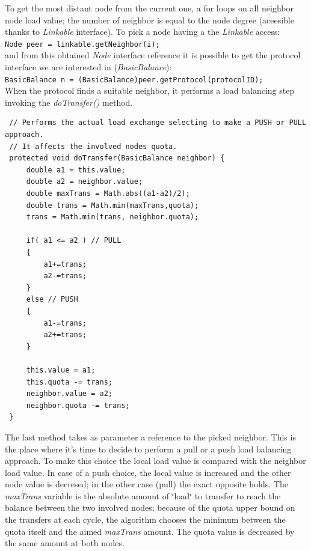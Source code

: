\documentclass[a4paper,12pt]{article}
\begin{document}
To get the most distant node from the current one, a for loops on
all neighbor node load value; the number of neighbor is equal to the
node degree (aceesible thanks to \emph{Linkable} interface). To pick
a node having a the \emph{Linkable} access:\\


\texttt{\footnotesize Node peer = linkable.getNeighbor(i);} \\


and from this obtained \emph{Node} interface reference it is possible
to get the protocol interface we are interested in (\emph{BasicBalance}):\\


\texttt{\footnotesize BasicBalance n = (BasicBalance)peer.getProtocol(protocolID);}
\\


When the protocol finds a suitable neighbor, it performs a load balancing
step invoking the \emph{doTransfer()} method.\\

\footnotesize
\begin{verbatim}
 // Performs the actual load exchange selecting to make a PUSH or PULL approach.
 // It affects the involved nodes quota. 
 protected void doTransfer(BasicBalance neighbor) {
     double a1 = this.value;
     double a2 = neighbor.value;
     double maxTrans = Math.abs((a1-a2)/2);
     double trans = Math.min(maxTrans,quota);
     trans = Math.min(trans, neighbor.quota);
 
     if( a1 <= a2 ) // PULL
     {
         a1+=trans;
         a2-=trans;
     }
     else // PUSH
     {
         a1-=trans;
         a2+=trans;
     }
     
     this.value = a1;
     this.quota -= trans;
     neighbor.value = a2;
     neighbor.quota -= trans; 
 }
\end{verbatim}
\normalsize


The last method takes as parameter a reference to the picked neighbor.
This is the place where it's time to decide to perform a pull or a
push load balancing approach. To make this choice the local load value
is compared with the neighbor load value. In case of a push choice,
the local value is increased and the other node value is decresed;
in the other case (pull) the exact opposite holds. The \emph{maxTrans}
variable is the absolute amount of \char`\"{}load\char`\"{} to transfer
to reach the balance between the two involved nodes; because of the
quota upper bound on the transfers at each cycle, the algorithm chooses
the minimum between the quota itself and the aimed \emph{maxTrans}
amount. The quota value is decreased by the same amount at both nodes.
\end{document}
